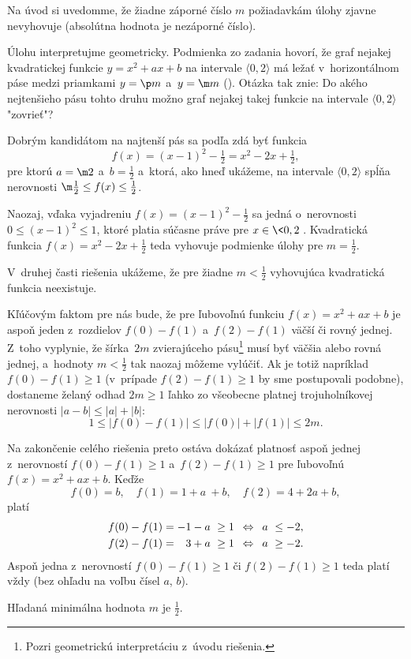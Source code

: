 {%
Na úvod si uvedomme, že žiadne záporné číslo $m$ požiadavkám úlohy zjavne
nevyhovuje (absolútna hodnota je nezáporné číslo).

Úlohu interpretujme geometricky. Podmienka zo zadania hovorí, že graf
nejakej kvadratickej funkcie $y=x^2+ax+b$ na intervale $\langle 0, 2\rangle$
má ležať v~horizontálnom páse medzi priamkami $y=\p m$ a~$y=\m m$ (\obr).
Otázka tak znie: Do akého nejtenšieho pásu tohto druhu možno graf nejakej
takej funkcie na intervale $\langle 0, 2 \rangle$ "zovrieť"?
%

Dobrým kandidátom na najtenší pás sa podľa  zdá byť funkcia
$$
f(x)=(x-1)^2 - \tfrac12 = x^2 -2x + \tfrac12,
$$
pre ktorú $a=\m2$ a~$b=\frac12$
a~ktorá, ako hneď ukážeme, na intervale $\langle 0, 2 \rangle$ spĺňa
nerovnosti $\m\frac12\le f(x)\le\frac12$.

Naozaj, vďaka vyjadreniu $f(x) =(x-1)^2 - \frac12$ sa jedná
o~nerovnosti $0\le(x-1)^2\le1$, ktoré platia súčasne práve pre $x\in\<0, 2\>$.
Kvadratická funkcia $f(x)=x^2 -2x + \frac12$ teda vyhovuje podmienke úlohy
pre $m = \frac12$.

V~druhej časti riešenia ukážeme, že pre žiadne $m < \frac12$ vyhovujúca
kvadratická funkcia neexistuje.

Kľúčovým faktom pre nás bude, že pre ľubovoľnú funkciu $f(x) = x^2 + ax
+ b$ je aspoň jeden z~rozdielov $f(0) - f(1)$ a~$f(2) - f(1)$ väčší či
rovný jednej. Z~toho vyplynie, že šírka~$2m$ zvierajúceho pásu\footnote{Pozri
geometrickú interpretáciu z~úvodu riešenia.} musí byť väčšia alebo rovná jednej,
a~hodnoty $m < \frac12$ tak naozaj môžeme vylúčiť.
Ak je totiž napríklad $f(0) - f(1) \ge 1$ (v~prípade $f(2) - f(1) \ge 1$ by sme
postupovali podobne), dostaneme želaný odhad $2m \ge 1$ ľahko
zo všeobecne platnej trojuholníkovej nerovnosti $|a-b| \le |a| +|b|$:
$$
1 \le |f(0) - f(1)| \le |f(0)| + |f(1)| \le 2m.
$$

Na zakončenie celého riešenia preto ostáva dokázať platnosť aspoň jednej
z~nerovností $f(0) - f(1) \ge 1$ a~$f(2) - f(1) \ge 1$ pre ľubovoľnú
$f(x) = x^2 + ax + b$.
Keďže
$$
f(0) = b, \quad f(1) = 1 + a~+ b, \quad f(2) = 4 + 2a + b,
$$
platí
$$
\aligned
f(0) - f(1)=-1-a~&\ge 1 \quad \Leftrightarrow \quad a~\le-2,\\
f(2) - f(1)=\phantom- 3+a~&\ge 1 \quad \Leftrightarrow \quad a~\ge-2.
\endaligned
$$
Aspoň jedna z~nerovností $f(0) - f(1) \ge 1$ či $f(2) - f(1)\ge 1$ teda
platí vždy (bez ohľadu na voľbu čísel $a$, $b$).

\odpoved
Hľadaná minimálna hodnota $m$ je $\frac12$.


}

